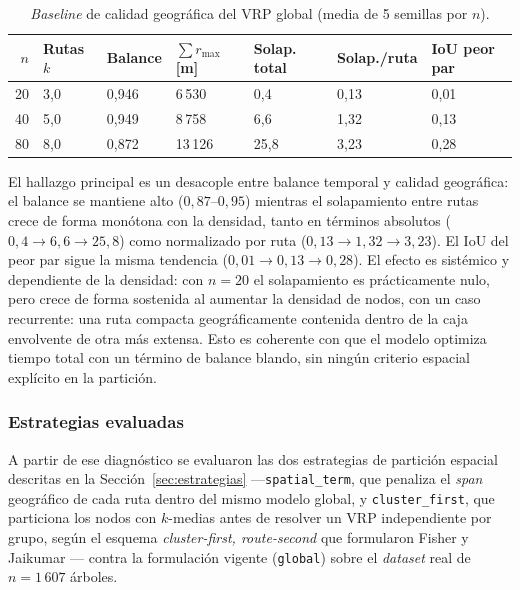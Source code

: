\begin{table}[H]
  \centering
  \caption{\textit{Baseline} de calidad geográfica del VRP global (media de 5 semillas por $n$).}
  \label{tab:baseline-geo}
  \begin{tabularx}{\textwidth}{rXXXXXX}
    \toprule
    $n$ & Rutas $k$ & Balance & $\sum r_{\max}$ [m] & Solap. total & Solap.\slash ruta & IoU peor par \\
    \midrule
    20 & 3{,}0 & 0{,}946 & 6\,530  & 0{,}4  & 0{,}13 & 0{,}01 \\
    40 & 5{,}0 & 0{,}949 & 8\,758  & 6{,}6  & 1{,}32 & 0{,}13 \\
    80 & 8{,}0 & 0{,}872 & 13\,126 & 25{,}8 & 3{,}23 & 0{,}28 \\
    \bottomrule
  \end{tabularx}
\end{table}

El hallazgo principal es un desacople entre balance temporal y calidad
geográfica: el balance se mantiene alto ($0{,}87$--$0{,}95$) mientras el
solapamiento entre rutas crece de forma monótona con la densidad, tanto en
términos absolutos ($0{,}4 \to 6{,}6 \to 25{,}8$) como normalizado por ruta
($0{,}13 \to 1{,}32 \to 3{,}23$). El IoU del peor par sigue la misma tendencia
($0{,}01 \to 0{,}13 \to 0{,}28$). El efecto es sistémico y dependiente de la
densidad: con $n=20$ el solapamiento es prácticamente nulo, pero crece de
forma sostenida al aumentar la densidad de nodos, con un caso
recurrente: una ruta compacta geográficamente contenida dentro de la caja
envolvente de otra más extensa. Esto es coherente con que el modelo optimiza
tiempo total con un término de balance blando, sin ningún criterio espacial
explícito en la partición.

\subsubsection*{Estrategias evaluadas}

A partir de ese diagnóstico se evaluaron las dos estrategias de partición
espacial descritas en la Sección~\ref{sec:estrategias} ---\texttt{spatial\_term},
que penaliza el \textit{span} geográfico de cada ruta dentro del mismo modelo
global, y \texttt{cluster\_first}, que particiona los nodos con $k$-medias
\citep{lloyd1982least,arthur2007kmeans} antes de resolver un VRP independiente por
grupo, según el esquema \textit{cluster-first, route-second} que formularon Fisher y
Jaikumar \citeyearpar{fisher1981generalized}--- contra la formulación vigente
(\texttt{global}) sobre el \textit{dataset} real de $n = 1\,607$ árboles.

